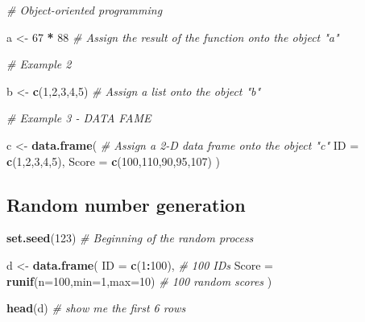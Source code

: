 \documentclass[
]{book}
\newenvironment{Shaded}{\begin{snugshade}}{\end{snugshade}}
\newcommand{\AttributeTok}[1]{\textcolor[rgb]{0.13,0.29,0.53}{#1}}
\newcommand{\CommentTok}[1]{\textcolor[rgb]{0.56,0.35,0.01}{\textit{#1}}}
\newcommand{\DecValTok}[1]{\textcolor[rgb]{0.00,0.00,0.81}{#1}}
\newcommand{\FunctionTok}[1]{\textcolor[rgb]{0.13,0.29,0.53}{\textbf{#1}}}
\newcommand{\NormalTok}[1]{#1}
\newcommand{\OtherTok}[1]{\textcolor[rgb]{0.56,0.35,0.01}{#1}}
\newcommand{\SpecialCharTok}[1]{\textcolor[rgb]{0.81,0.36,0.00}{\textbf{#1}}}
\begin{document}
\begin{Shaded}
\begin{Highlighting}[]
\CommentTok{\# Object{-}oriented programming }

\NormalTok{a }\OtherTok{\textless{}{-}} \DecValTok{67} \SpecialCharTok{*} \DecValTok{88} \CommentTok{\# Assign the result of the function onto the object "a"}

\CommentTok{\# Example 2 }

\NormalTok{b }\OtherTok{\textless{}{-}} \FunctionTok{c}\NormalTok{(}\DecValTok{1}\NormalTok{,}\DecValTok{2}\NormalTok{,}\DecValTok{3}\NormalTok{,}\DecValTok{4}\NormalTok{,}\DecValTok{5}\NormalTok{) }\CommentTok{\# Assign a list onto the object "b"}

\CommentTok{\# Example 3 {-} DATA FAME }

\NormalTok{c }\OtherTok{\textless{}{-}} \FunctionTok{data.frame}\NormalTok{( }\CommentTok{\# Assign a 2{-}D data frame onto the object "c"}
  \AttributeTok{ID =} \FunctionTok{c}\NormalTok{(}\DecValTok{1}\NormalTok{,}\DecValTok{2}\NormalTok{,}\DecValTok{3}\NormalTok{,}\DecValTok{4}\NormalTok{,}\DecValTok{5}\NormalTok{), }
  \AttributeTok{Score =} \FunctionTok{c}\NormalTok{(}\DecValTok{100}\NormalTok{,}\DecValTok{110}\NormalTok{,}\DecValTok{90}\NormalTok{,}\DecValTok{95}\NormalTok{,}\DecValTok{107}\NormalTok{)}
\NormalTok{)}
\end{Highlighting}
\end{Shaded}

\subsection*{Random number generation}\label{random-number-generation}

\begin{Shaded}
\begin{Highlighting}[]
\FunctionTok{set.seed}\NormalTok{(}\DecValTok{123}\NormalTok{) }\CommentTok{\# Beginning of the random process}

\NormalTok{d }\OtherTok{\textless{}{-}} \FunctionTok{data.frame}\NormalTok{(}
  \AttributeTok{ID =} \FunctionTok{c}\NormalTok{(}\DecValTok{1}\SpecialCharTok{:}\DecValTok{100}\NormalTok{), }\CommentTok{\# 100 IDs}
  \AttributeTok{Score =} \FunctionTok{runif}\NormalTok{(}\AttributeTok{n=}\DecValTok{100}\NormalTok{,}\AttributeTok{min=}\DecValTok{1}\NormalTok{,}\AttributeTok{max=}\DecValTok{10}\NormalTok{) }\CommentTok{\# 100 random scores}
\NormalTok{)}

\FunctionTok{head}\NormalTok{(d) }\CommentTok{\# show me the first 6 rows}
\end{Highlighting}
\end{Shaded}
\end{document}
